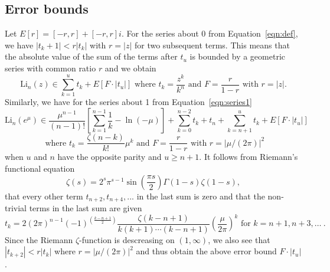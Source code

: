 \documentclass[utopia]{nmd/article}
\def\Li{\mathrm{Li}}
\begin{document}
\subsection{Error bounds}

Let $E[r]=[-r,r]+[-r,r] i$. For the series about 0 from Equation~\ref{eqn:def}, we have $|t_k+1| < r|t_k|$ with $r=|z|$ for two subsequent terms. This means that the absolute value of the sum of the terms after $t_u$ is bounded by a geometric series with common ratio $r$ and we obtain
\begin{equation} \label{eqn:defSeriesInterval}
\Li_n(z)\in \sum_{k=1}^u t_k + E\left[F\cdot \left| t_u\right|\right]\mbox{ where } t_k = \frac{z^k}{k^n} \mbox{ and } F=\frac{r}{1-r} \mbox{ with } r=|z|.
\end{equation}
Similarly, we have for the series about 1 from Equation~\ref{eqn:series1}
\begin{equation} \label{eqn:series1interval}
\Li_n(e^\mu)\in \frac{\mu^{n-1}}{(n-1)!} \left[\sum_{k=1}^{n-1}\frac{1}{k} - \ln(-\mu)\right] + \sum_{k=0}^{n-2} t_k + t_n + \sum_{k=n+1}^u t_k + E\left[F\cdot \left|t_u\right|\right]
\end{equation}
$$ \mbox{ where } t_k=\frac{\zeta(n-k)}{k!} \mu^k \mbox{ and } F=\frac{r}{1-r} \mbox{ with } r=|\mu/(2\pi)|^2$$
when $u$ and $n$ have the opposite parity and $u\geq n+1$. It follows from Riemann's functional equation
\begin{equation}\label{eqn:riemann}
\zeta(s) = 2^s \pi^{s-1} \sin\left(\frac{\pi s}{2}\right) \Gamma(1-s)\zeta(1-s),
\end{equation}
that every other term $t_{n+2}, t_{n+4}, ...$ in the last sum is zero and that the non-trivial terms in the last sum are given
$$t_k = 2(2\pi)^{n-1} (-1)^{\left(\frac{k-n+1}{2}\right)} \frac{\zeta(k-n+1)}{k(k+1)\cdots(k-n+1)} \left(\frac{\mu}{2\pi}\right)^k \mbox { for } k=n+1,n+3, \dots~ .$$
Since the Riemann $\zeta$-function is descreasing on $(1, \infty)$, we also see that $|t_{k+2}| < r |t_k|$ where $r=|\mu/(2\pi)|^2$ and thus obtain the above error bound $F\cdot |t_u|$.
\end{document}
